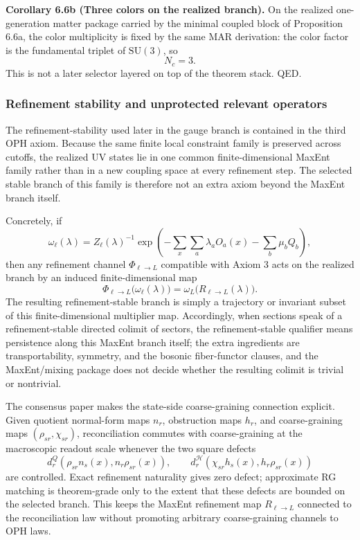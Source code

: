\textbf{Corollary 6.6b (Three colors on the realized branch).} On the realized one-generation matter package carried by the minimal coupled block of Proposition 6.6a, the color multiplicity is fixed by the same MAR derivation: the color factor is the fundamental triplet of \(\mathrm{SU}(3)\), so
\[
N_c=3.
\]
This is not a later selector layered on top of the theorem stack. QED.

\subsubsection{Refinement stability and unprotected relevant operators}\label{63-refinement-stability-and-unprotected-relevant-operators}

The refinement-stability used later in the gauge branch is contained in the third OPH axiom. Because the same finite local constraint family is preserved across cutoffs, the realized UV states lie in one common finite-dimensional MaxEnt family rather than in a new coupling space at every refinement step. The selected stable branch of this family is therefore not an extra axiom beyond the MaxEnt branch itself.

Concretely, if
\[
\omega_\ell(\lambda)
=
Z_\ell(\lambda)^{-1}
\exp\!\left(
-\sum_x \sum_a \lambda_a O_a(x)-\sum_b \mu_b Q_b
\right),
\]
then any refinement channel \(\Phi_{\ell\to L}\) compatible with Axiom 3 acts on the realized branch by an induced finite-dimensional map
\[
\Phi_{\ell\to L}\bigl(\omega_\ell(\lambda)\bigr)
=
\omega_L\!\bigl(R_{\ell\to L}(\lambda)\bigr).
\]
The resulting refinement-stable branch is simply a trajectory or invariant subset of this finite-dimensional multiplier map. Accordingly, when sections speak of a refinement-stable directed colimit of sectors, the refinement-stable qualifier means persistence along this MaxEnt branch itself; the extra ingredients are transportability, symmetry, and the bosonic fiber-functor clauses, and the MaxEnt/mixing package does not decide whether the resulting colimit is trivial or nontrivial.

The consensus paper makes the state-side coarse-graining connection explicit. Given quotient
normal-form maps \(n_r\), obstruction maps \(h_r\), and coarse-graining maps
\((\rho_{sr},\chi_{sr})\), reconciliation commutes with coarse-graining at the macroscopic readout
scale whenever the two square defects
\[
d^Q_r(\rho_{sr}n_s(x),n_r\rho_{sr}(x)),
\qquad
d^{\mathcal H}_r(\chi_{sr}h_s(x),h_r\rho_{sr}(x))
\]
are controlled. Exact refinement naturality gives zero defect; approximate RG matching is
theorem-grade only to the extent that these defects are bounded on the selected branch. This keeps
the MaxEnt refinement map \(R_{\ell\to L}\) connected to the reconciliation law without promoting
arbitrary coarse-graining channels to OPH laws.

